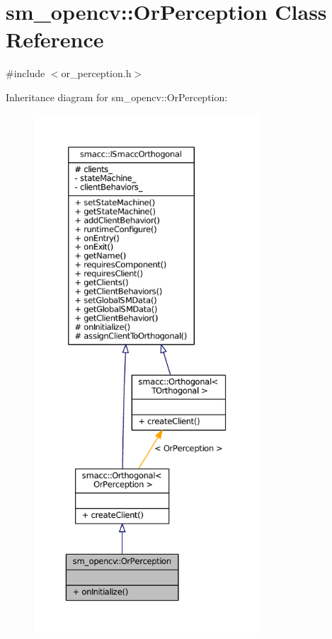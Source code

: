 \hypertarget{classsm__opencv_1_1OrPerception}{}\section{sm\+\_\+opencv\+:\+:Or\+Perception Class Reference}
\label{classsm__opencv_1_1OrPerception}


{\ttfamily \#include $<$or\+\_\+perception.\+h$>$}



Inheritance diagram for sm\+\_\+opencv\+:\+:Or\+Perception\+:
\nopagebreak
\begin{figure}[H]
\begin{center}
\leavevmode
\includegraphics[height=550pt]{classsm__opencv_1_1OrPerception__inherit__graph}
\end{center}
\end{figure}


